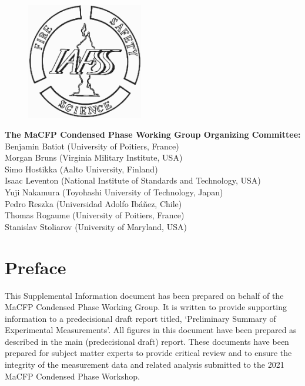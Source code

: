\documentclass{book}
\begin{document}
\begin{minipage}{0.25\textwidth}
\begin{figure}[H]
\includegraphics[width=2in]{FIGURES/IAFSSLogo}
\end{figure}
\end{minipage} \hfill
\begin{minipage}{0.7\textwidth}
\begin{flushright}
{\bf The MaCFP Condensed Phase Working Group Organizing Committee:} \\
Benjamin Batiot (University of Poitiers, France) \\
Morgan Bruns (Virginia Military Institute, USA) \\
Simo Hostikka (Aalto University, Finland) \\
Isaac Leventon (National Institute of Standards and Technology, USA) \\
Yuji Nakamura (Toyohashi University of Technology, Japan) \\
Pedro Reszka (Universidad Adolfo Ibáñez, Chile) \\
Thomas Rogaume (University of Poitiers, France) \\
Stanislav Stoliarov (University of Maryland, USA)
\end{flushright}
\end{minipage}


\newpage
\thispagestyle{empty}

\frontmatter


\chapter{Preface}

This Supplemental Information document has been prepared on behalf of the MaCFP Condensed Phase Working Group. It is written to provide supporting information to a predecisional draft report titled, `Preliminary Summary of Experimental Measurements'. All figures in this document have been prepared as described in the main (predecisional draft) report. These documents have been prepared for subject matter experts to provide critical review and to ensure the integrity of the measurement data and related analysis submitted to the 2021 MaCFP Condensed Phase Workshop. 
\end{document}
